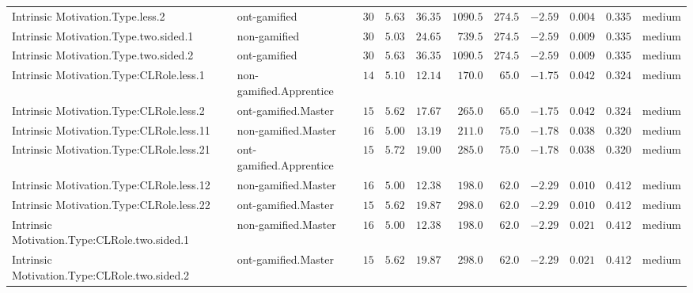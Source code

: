 \documentclass[6pt,a4paper]{article}
\begin{document}
\begin{landscape}
{\begin{longtable}{llrrrrrrrrl}
Intrinsic Motivation.Type.less.2&ont-gamified&$30$&$5.63$&$36.35$&$1090.5$&$274.5$&$-2.59$&$0.004$&$0.335$&medium\tabularnewline
Intrinsic Motivation.Type.two.sided.1&non-gamified&$30$&$5.03$&$24.65$&$ 739.5$&$274.5$&$-2.59$&$0.009$&$0.335$&medium\tabularnewline
Intrinsic Motivation.Type.two.sided.2&ont-gamified&$30$&$5.63$&$36.35$&$1090.5$&$274.5$&$-2.59$&$0.009$&$0.335$&medium\tabularnewline
Intrinsic Motivation.Type:CLRole.less.1&non-gamified.Apprentice&$14$&$5.10$&$12.14$&$ 170.0$&$ 65.0$&$-1.75$&$0.042$&$0.324$&medium\tabularnewline
Intrinsic Motivation.Type:CLRole.less.2&ont-gamified.Master&$15$&$5.62$&$17.67$&$ 265.0$&$ 65.0$&$-1.75$&$0.042$&$0.324$&medium\tabularnewline
Intrinsic Motivation.Type:CLRole.less.11&non-gamified.Master&$16$&$5.00$&$13.19$&$ 211.0$&$ 75.0$&$-1.78$&$0.038$&$0.320$&medium\tabularnewline
Intrinsic Motivation.Type:CLRole.less.21&ont-gamified.Apprentice&$15$&$5.72$&$19.00$&$ 285.0$&$ 75.0$&$-1.78$&$0.038$&$0.320$&medium\tabularnewline
Intrinsic Motivation.Type:CLRole.less.12&non-gamified.Master&$16$&$5.00$&$12.38$&$ 198.0$&$ 62.0$&$-2.29$&$0.010$&$0.412$&medium\tabularnewline
Intrinsic Motivation.Type:CLRole.less.22&ont-gamified.Master&$15$&$5.62$&$19.87$&$ 298.0$&$ 62.0$&$-2.29$&$0.010$&$0.412$&medium\tabularnewline
\newpage
Intrinsic Motivation.Type:CLRole.two.sided.1&non-gamified.Master&$16$&$5.00$&$12.38$&$ 198.0$&$ 62.0$&$-2.29$&$0.021$&$0.412$&medium\tabularnewline
Intrinsic Motivation.Type:CLRole.two.sided.2&ont-gamified.Master&$15$&$5.62$&$19.87$&$ 298.0$&$ 62.0$&$-2.29$&$0.021$&$0.412$&medium\tabularnewline
\hline
\end{longtable}}

\end{landscape}
\end{document}
